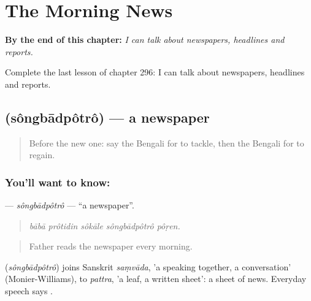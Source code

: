 
\chapter{The Morning News}
\label{ch:bn-the-morning-news}

\begin{chapteropening}
\textbf{By the end of this chapter:} \emph{I can talk about newspapers, headlines and reports.}

Complete the last lesson of chapter 296: I can talk about newspapers, headlines and reports.
\end{chapteropening}

\section[\texorpdfstring{\bn{সংবাদপত্র} (sôngbādpôtrô)}{সংবাদপত্র (sôngbādpôtrô)}]{ (sôngbādpôtrô) — a newspaper}

\label{lesson:BN-C296-songbadpotro}



\begin{quote}
Before the new one: say the Bengali for to tackle, then the Bengali for to regain.
\end{quote}

\subsection*{You'll want to know: }
\textbf{} — \emph{sôngbādpôtrô} — \textquotedblleft{}a newspaper\textquotedblright{}.

\begin{quote}
    
\end{quote}

\begin{quote}
\emph{bābā prôtidin sôkāle sôngbādpôtrô pôṛen.}
\end{quote}

\begin{quote}
Father reads the newspaper every morning.
\end{quote}

\begin{cousinweb}
\textbf{} (\emph{sôngbādpôtrô}) joins Sanskrit \emph{saṃvāda}, 'a speaking together, a conversation' (Monier-Williams), to \emph{pattra}, 'a leaf, a written sheet': a sheet of news. Everyday speech says  .
\end{cousinweb}

